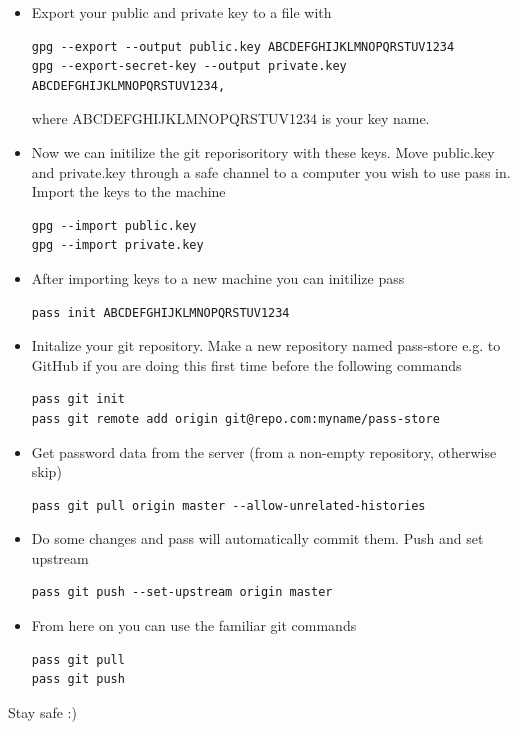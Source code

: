 \documentclass{article}
\begin{document}
\begin{itemize}
\item Export your public and private key to a file with \\
  \begin{verbatim}
gpg --export --output public.key ABCDEFGHIJKLMNOPQRSTUV1234 
gpg --export-secret-key --output private.key ABCDEFGHIJKLMNOPQRSTUV1234,
  \end{verbatim}
  where ABCDEFGHIJKLMNOPQRSTUV1234 is your key name.\\
\item Now we can initilize the git reporisoritory with these keys. Move public.key and private.key through a safe channel to a computer you wish to use pass in. Import the keys to the machine \\
\begin{verbatim}
gpg --import public.key
gpg --import private.key
\end{verbatim}
\item After importing keys to a new machine you can initilize pass
\begin{verbatim}
pass init ABCDEFGHIJKLMNOPQRSTUV1234
\end{verbatim}

\item Initalize your git repository. Make a new repository named pass-store e.g. to GitHub if you are doing this first time before the following commands\\
\begin{verbatim}
pass git init 
pass git remote add origin git@repo.com:myname/pass-store
 \end{verbatim}
\item Get password data from the server (from a non-empty repository, otherwise skip)
\begin{verbatim}
pass git pull origin master --allow-unrelated-histories
\end{verbatim}
\item Do some changes and pass will automatically commit them. Push and set upstream \\
\begin{verbatim}
pass git push --set-upstream origin master 
\end{verbatim}
\item From here on you can use the familiar git commands \\
\begin{verbatim}
pass git pull 
pass git push 
\end{verbatim}
\end{itemize}
Stay safe :)
\end{document}
